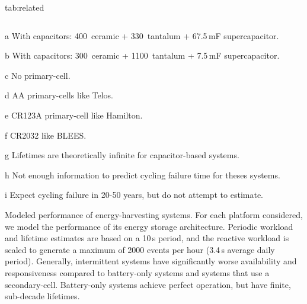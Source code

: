 \begin{definetable}{tab:related}
\begin{threeparttable}
\begin{tabular}{l | c c| c c| c}
  \end{tabular}
    \begin{tablenotes}[para]
      \item[a] With capacitors: 400\,\ssi{\micro\farad} ceramic + 330\,\ssi{\micro\farad} tantalum + 67.5\,mF supercapacitor.
      \item[b] With capacitors: 300\,\ssi{\micro\farad} ceramic + 1100\,\ssi{\micro\farad} tantalum + 7.5\,mF supercapacitor.
      \item[c] No primary-cell.
      \item[d] AA primary-cells like Telos.
      \item[e] CR123A primary-cell like Hamilton.
      \item[f] CR2032 like BLEES.
      \item[g] Lifetimes are theoretically infinite for capacitor-based systems.
      \item[h] Not enough information to predict cycling failure time for theses systems.
      \item[i] Expect cycling failure in 20-50 years, but do not attempt to estimate.
    \end{tablenotes}
  \end{threeparttable}
  \caption{
  \normalfont
      Modeled performance of energy-harvesting systems.
    For each  platform considered, we model the performance of its energy storage
    architecture. Periodic workload and lifetime estimates are based on a 10\,s
    period, and the reactive workload is scaled to
    generate a maximum of 2000 events per hour (3.4\,s average daily period). Generally,
    intermittent systems have significantly worse availability and responsiveness compared to
    battery-only systems and systems that use a secondary-cell. Battery-only
    systems achieve perfect operation, but have finite, sub-decade lifetimes.
    }
\end{definetable}

